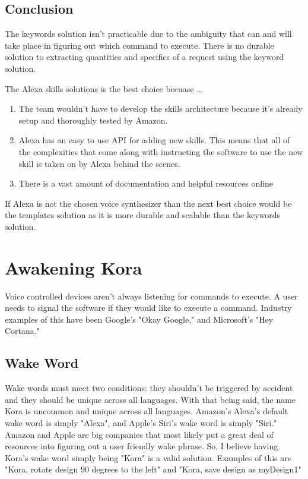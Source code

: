 \documentclass[onecolumn, draftclsnofoot,10pt, compsoc]{IEEEtran}
\begin{document}
	
		\subsection{Conclusion}
			The keywords solution isn't practicable due to the ambiguity that can and will take place in figuring out which command to execute.
			There is no durable solution to extracting quantities and specifics of a request using the keyword solution.
			
			The Alexa skills solutions is the best choice becuase \dots
			\begin{enumerate}
				\item{
					The team wouldn't have to develop the skills architecture because it's already setup and thoroughly tested by Amazon.}
				\item{
					Alexa has an easy to use API for adding new skills.
					This means that all of the complexities that come along with instructing the software to use the new skill is taken on by Alexa behind the scenes.}
				\item{
					There is a vast amount of documentation and helpful resources online}
			\end{enumerate}
			
			If Alexa is not the chosen voice synthesizer than the next best choice would be the templates solution as it is more durable and scalable than the keywords solution.

	
	\section{Awakening Kora}
		Voice controlled devices aren't always listening for commands to execute.
		A user needs to signal the software if they would like to execute a command.
		Industry examples of this have been Google's "Okay Google," and Microsoft's "Hey Cortana."
		
		\subsection{Wake Word}
			Wake words must meet two conditions: they shouldn't be triggered by accident and they should be unique across all languages.
			With that being said, the name Kora is uncommon and unique across all languages.
			Amazon's Alexa's default wake word is simply "Alexa", and Apple's Siri's wake word is simply "Siri."
			Amazon and Apple are big companies that most likely put a great deal of resources into figuring out a user friendly wake phrase.
			So, I believe having Kora's wake word simply being "Kora" is a valid solution.
			Examples of this are "Kora, rotate design 90 degrees to the left" and "Kora, save design as myDesign1"
		
\end{document}
